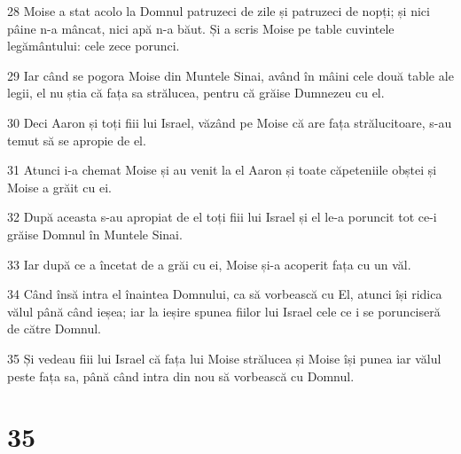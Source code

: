 \par 28 Moise a stat acolo la Domnul patruzeci de zile și patruzeci de nopți; și nici pâine n-a mâncat, nici apă n-a băut. Și a scris Moise pe table cuvintele legământului: cele zece porunci.
\par 29 Iar când se pogora Moise din Muntele Sinai, având în mâini cele două table ale legii, el nu știa că fața sa strălucea, pentru că grăise Dumnezeu cu el.
\par 30 Deci Aaron și toți fiii lui Israel, văzând pe Moise că are fața strălucitoare, s-au temut să se apropie de el.
\par 31 Atunci i-a chemat Moise și au venit la el Aaron și toate căpeteniile obștei și Moise a grăit cu ei.
\par 32 După aceasta s-au apropiat de el toți fiii lui Israel și el le-a poruncit tot ce-i grăise Domnul în Muntele Sinai.
\par 33 Iar după ce a încetat de a grăi cu ei, Moise și-a acoperit fața cu un văl.
\par 34 Când însă intra el înaintea Domnului, ca să vorbească cu El, atunci își ridica vălul până când ieșea; iar la ieșire spunea fiilor lui Israel cele ce i se porunciseră de către Domnul.
\par 35 Și vedeau fiii lui Israel că fața lui Moise strălucea și Moise își punea iar vălul peste fața sa, până când intra din nou să vorbească cu Domnul.

\chapter{35}

